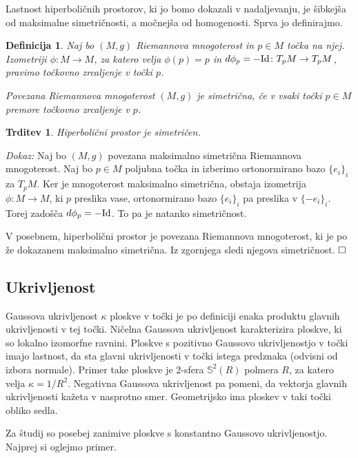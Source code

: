 \documentclass[a4paper]{article}
\newtheorem{definicija}{Definicija}
\newtheorem{trditev}{Trditev}
\def\qed{$\hfill\Box$}   %
\begin{document}
Lastnost hiperboličnih prostorov, ki jo bomo dokazali v nadaljevanju, je šibkejša od maksimalne simetričnosti, a močnejša od homogenosti. Sprva jo definirajmo.

\begin{definicija}
Naj bo $(M,g)$ Riemannova mnogoterost in $p\in M$ točka na njej. Izometriji $\phi \colon M \to M$, za katero velja $\phi(p) = p$ in $d\phi_{p} = -\textup{Id} \colon T_{p}M \to T_{p}M$, pravimo \emph{točkovno zrcaljenje} v točki $p$.

Povezana Riemannova mnogoterost $(M,g)$ je \emph{simetrična}, če v vsaki točki $p \in M$ premore točkovno zrcaljenje v $p$.
\end{definicija}

\begin{trditev}
Hiperbolični prostor je simetričen.
\end{trditev}

\noindent
{\em Dokaz:\/} 
Naj bo $(M,g)$ povezana maksimalno simetrična Riemannova mnogoterost. Naj bo $p \in M$ poljubna točka in izberimo ortonormirano bazo $\{ e_{i} \}_{i}$ za $T_{p}M$. Ker je mnogoterost maksimalno simetrična, obstaja izometrija $\phi \colon M \to M$, ki $p$ preslika vase, ortonormirano bazo $\{e_{i} \}_{i}$ pa preslika v $\{ -e_{i} \}_{i}$. Torej zadošča $d\phi_{p} = -\textup{Id}$. To pa je natanko simetričnost.

V posebnem, hiperbolični prostor je povezana Riemannova mnogoterost, ki je po že dokazanem maksimalno simetrična. Iz zgornjega sledi njegova simetričnost. 
\qed

\subsection{Ukrivljenost}

Gaussova ukrivljenost $\kappa$ ploskve v točki je po definiciji enaka produktu glavnih ukrivljenosti v tej točki. 
Ničelna Gaussova ukrivljenost karakterizira ploskve, ki so lokalno izomorfne ravnini.
Ploskve s pozitivno Gaussovo ukrivljenostjo v točki imajo lastnost, da sta glavni ukrivljenosti v točki istega predznaka (odvisni od izbora normale). Primer take ploskve je 2-sfera $\mathbb{S}^{2}(R)$ polmera $R$, za katero velja $\kappa = 1/R^2$. 
Negativna Gaussova ukrivljenost pa pomeni, da vektorja glavnih ukrivljenosti kažeta v nasprotno smer. Geometrijsko ima ploskev v taki točki obliko sedla. 

Za študij so posebej zanimive ploskve s konstantno Gaussovo ukrivljenostjo. Najprej si oglejmo primer.
\end{document}
